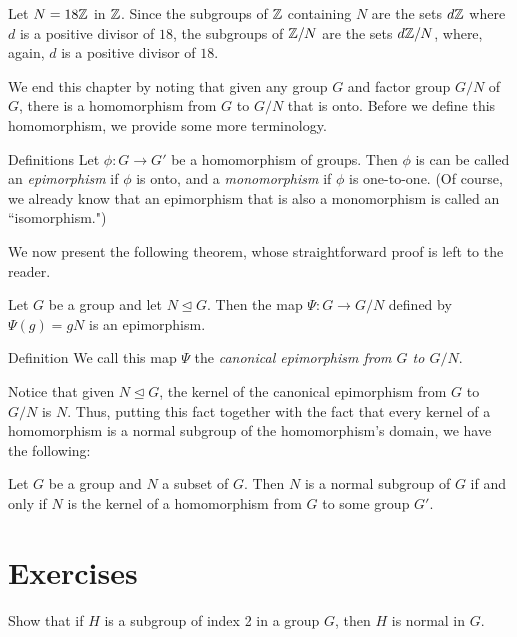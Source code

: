 \begin{example}{} Let $N=18\mathbb{Z}$ in $\mathbb{Z}$. Since the subgroups of $\mathbb{Z}$ containing $N$
are the sets $d\mathbb{Z}$ where $d$ is a positive divisor of $18$, the
subgroups of $\mathbb{Z}/N$ are the sets $d\mathbb{Z}/N$, where, again, $d$ is a
positive divisor of $18$. \end{example}

 We end this chapter by noting that given any group $G$ and
factor group $G/N$ of $G$, there is a homomorphism from $G$ to $G/N$
that is onto. Before we define this homomorphism, we provide some
more terminology.

\begin{df}{Definitions} Let $\phi: G\to G'$ be a homomorphism of groups. Then
$\phi$ is can be called an \textit{epimorphism} if $\phi$ is onto,
and a \textit{monomorphism} if $\phi$ is one-to-one. (Of course,
we already know that an epimorphism that is also a monomorphism
is called an ``isomorphism.")\end{df}

 We now present the following theorem, whose straightforward
proof is left to the reader.

 \begin{thm}\label{}  Let $G$ be a group and let $N\unlhd G$. Then the
map $\Psi: G\to G/N$ defined by $\Psi(g)=gN$ is an epimorphism. \end{thm}

\begin{df}{Definition} We call this map $\Psi$ the \textit{canonical epimorphism
from $G$ to $G/N$}.\end{df}

 Notice that given $N\unlhd G$, the kernel of the canonical
epimorphism from $G$ to $G/N$ is $N$.  Thus, putting this fact
together with the fact that every kernel of a homomorphism is a
normal subgroup of the homomorphism's domain, we have the following:

\begin{thm}\label{} Let $G$ be a group and $N$ a subset of $G$.  Then $N$
is a normal subgroup of $G$ if and only if $N$ is the kernel of a
homomorphism from $G$ to some group $G'$. \end{thm}

\pagebreak

\section{Exercises}

\begin{exercise} Show that if $H$ is a subgroup of index 2 in a group
    $G$, then $H$ is normal in $G$.
\end{exercise}

